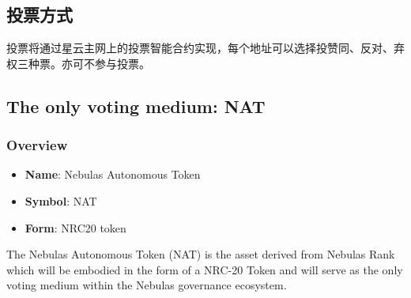 \subsection{投票方式}

投票将通过星云主网上的投票智能合约实现，每个地址可以选择投赞同、反对、弃权三种票。亦可不参与投票。

\subsection{The only voting medium: NAT}
\label{nat}

\subsubsection{Overview}

\begin{itemize}
	\item \textbf{Name}: Nebulas Autonomous Token
	\item \textbf{Symbol}: NAT
	\item \textbf{Form}: NRC20 token
\end{itemize}

The Nebulas Autonomous Token (NAT) is the asset derived from Nebulas Rank which will be embodied in the form of a NRC-20 Token and will serve as the only voting medium within the Nebulas governance ecosystem.

